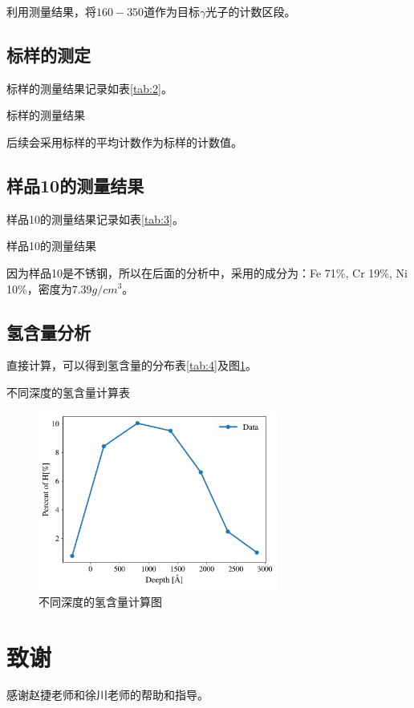 \documentclass{article}
\begin{document}
利用测量结果，将$160-350$道作为目标$\gamma$光子的计数区段。
\subsection{标样的测定}
标样的测量结果记录如表\ref{tab:2}。
\begin{table}[htbp]
  \centering
  \caption{标样的测量结果\label{tab:2}}
  
\end{table}
后续会采用标样的平均计数作为标样的计数值。
\subsection{样品10的测量结果}
样品10的测量结果记录如表\ref{tab:3}。
\begin{table}[htbp]
  \centering
  \caption{样品10的测量结果\label{tab:3}}
  
\end{table}
因为样品10是不锈钢，所以在后面的分析中，采用的成分为：Fe 71\%, Cr 19\%, Ni 10\%，密度为$7.39\si{g\per cm^3}$。
\subsection{氢含量分析}
直接计算，可以得到氢含量的分布表\ref{tab:4}及图\ref{fig:1}。
\begin{table}[htbp]
  \centering
  \caption{不同深度的氢含量计算表\label{tab:4}}
  
\end{table}
\begin{figure}
  \centering
  \includegraphics[width=0.7\textwidth]{../Analysis/Hpercent.pdf}
  \caption{不同深度的氢含量计算图\label{fig:1}}
\end{figure}
\section{致谢}
    感谢赵捷老师和徐川老师的帮助和指导。 
\end{document}
